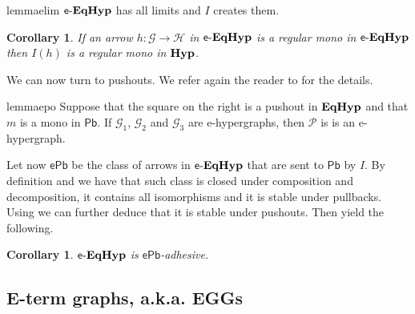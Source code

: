 \documentclass[a4paper,UKenglish,cleveref,pdftex,amsthm,thm-restate,numberwithinsect]{cas-sc}
\newcommand{\pbc}{\mathsf{Pb}}
\newcommand{\pbe}{\mathsf{ePb}}
\theoremstyle{plain}
\newtheorem{corollary}[theorem]{Corollary}
\theoremstyle{definition}
\newcommand{\catname}[1]{\textbf{\textup{#1}}}
\newcommand{\hyp}{\catname{Hyp}}
\newcommand{\EqHyp}{\catname{EqHyp}} %
\newcommand{\egg}{\mathsf{e}\text{-}\catname{EqHyp}}
\newcommand{\commentato}[1]{ {} }
\begin{document}
\begin{restatable}{lemma}{elim}\label{lem:elim}
	$\egg$ has all limits and $I$ creates them.
\end{restatable}


\begin{corollary}\label{cor:ereg}
	If an arrow $h: \mathcal{G \to H}$ in $\egg$ is a regular mono in $\egg$ then $I(h)$ is a regular mono in $\hyp$. 
\end{corollary}

We can now turn to pushouts. We refer again the reader to  for the details.

\noindent
\parbox{11.5cm}{\begin{restatable}{lemma}{epo}\label{lem:epo}
	Suppose that the square on the right is a pushout in $\EqHyp$ and that $m$ is a mono in $\pbc$. If $\mathcal{G}_1$, $\mathcal{G}_2$ and $\mathcal{G}_3$ are e-hypergraphs, then $\mathcal{P}$ is 
	is an e-hypergraph.
\end{restatable}}\hfill 
\parbox{4cm}{}

\commentato{ 
\begin{restatable}{corollary}{rege}\label{cor:rege}
		An arrow $h\colon \mathcal{G \to H}$  is a regular mono in $\egg$ if and only if $I(h)$ is a regular mono in $\hyp$.  In particular a morphism of $\egg$ is a regular mono if and only if all its components are injections.
\end{restatable}
\begin{proof}
	contenuto...
\end{proof}
}

Let now $\pbe$ be the class of arrows in $\egg$ that are sent to $\pbc$ by $I$. By definition and  we have that such class is closed under composition and decomposition, it contains all isomorphisms and it is stable under pullbacks. Using  we can further deduce that it is stable under pushouts. Then  yield the following.

\begin{corollary}\label{cor:pbe}
	$\egg$ is $\pbe$-adhesive.
\end{corollary}

\subsection{E-term graphs, a.k.a. EGGs}
\end{document}
